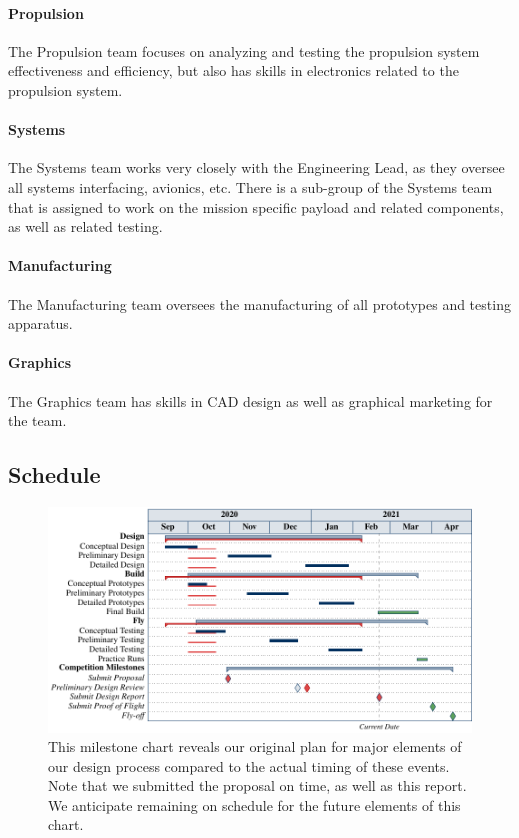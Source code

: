 \documentclass[report]{byu-aero}
\begin{document}
\paragraph{Propulsion} The Propulsion team focuses on analyzing and testing the propulsion system effectiveness and efficiency, but also has skills in electronics related to the propulsion system.
\paragraph{Systems} The Systems team works very closely with the Engineering Lead, as they oversee all systems interfacing, avionics, etc.  There is a sub-group of the Systems team that is assigned to work on the mission specific payload and related components, as well as related testing. %
\paragraph{Manufacturing} The Manufacturing team oversees the manufacturing of all prototypes and testing apparatus.
\paragraph{Graphics} The Graphics team has skills in CAD design as well as graphical marketing for the team. 


\subsection{Schedule}
\label{ssec:Schedule}


\begin{figure}[h!]
	\centering
	\includegraphics[]{ganttchart.pdf}
	\caption{This milestone chart reveals our {\color{\BYUblue} original plan} for major elements of our design process compared to the  {\color{\BYUred} actual timing} of these events.  Note that we submitted the proposal on time, as well as this report.  We anticipate remaining on schedule for the {\color{\BYUgreen} future elements} of this chart.}
	\label{fig:plannedvsactualtiming}
\end{figure}
\end{document}
